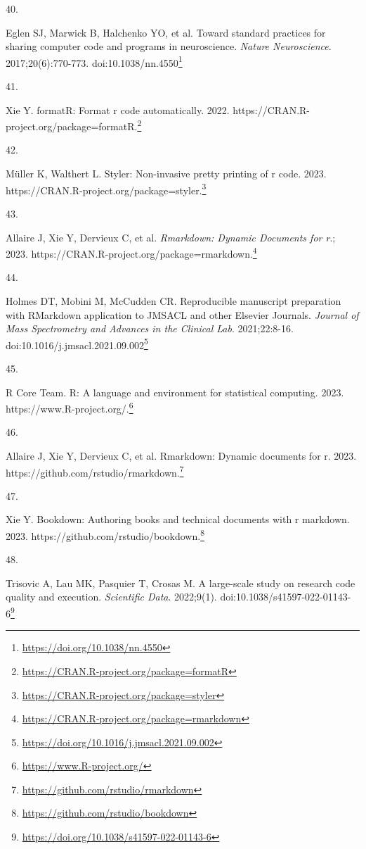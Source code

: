 \documentclass[
  a4paper,
]{book}
\newlength{\cslhangindent}
\newlength{\csllabelwidth}
\newlength{\cslentryspacingunit} %
\newenvironment{CSLReferences}[2] %
 {%
  \setlength{\parindent}{0pt}
  \ifodd #1
  \let\oldpar\par
  \def\par{\hangindent=\cslhangindent\oldpar}
  \fi
  \setlength{\parskip}{#2\cslentryspacingunit}
 }%
 {}
\newcommand{\CSLLeftMargin}[1]{\parbox[t]{\csllabelwidth}{#1}}
\newcommand{\CSLRightInline}[1]{\parbox[t]{\linewidth - \csllabelwidth}{#1}\break}
\renewcommand{\href}[2]{#2\footnote{\url{#1}}}
\begin{document}
\begin{CSLReferences}{0}{0}
\leavevmode{}%
\CSLLeftMargin{40. }%
\CSLRightInline{Eglen SJ, Marwick B, Halchenko YO, et al. Toward standard practices for sharing computer code and programs in neuroscience. \emph{Nature Neuroscience}. 2017;20(6):770-773. doi:\href{https://doi.org/10.1038/nn.4550}{10.1038/nn.4550}}

\leavevmode{}%
\CSLLeftMargin{41. }%
\CSLRightInline{Xie Y. formatR: Format r code automatically. 2022. \href{https://CRAN.R-project.org/package=formatR}{https://CRAN.R-project.org/package=formatR.}}

\leavevmode{}%
\CSLLeftMargin{42. }%
\CSLRightInline{Müller K, Walthert L. Styler: Non-invasive pretty printing of r code. 2023. \href{https://CRAN.R-project.org/package=styler}{https://CRAN.R-project.org/package=styler.}}

\leavevmode{}%
\CSLLeftMargin{43. }%
\CSLRightInline{Allaire J, Xie Y, Dervieux C, et al. \emph{Rmarkdown: Dynamic Documents for r}.; 2023. \href{https://CRAN.R-project.org/package=rmarkdown}{https://CRAN.R-project.org/package=rmarkdown.}}

\leavevmode{}%
\CSLLeftMargin{44. }%
\CSLRightInline{Holmes DT, Mobini M, McCudden CR. Reproducible manuscript preparation with RMarkdown application to JMSACL and other Elsevier Journals. \emph{Journal of Mass Spectrometry and Advances in the Clinical Lab}. 2021;22:8-16. doi:\href{https://doi.org/10.1016/j.jmsacl.2021.09.002}{10.1016/j.jmsacl.2021.09.002}}

\leavevmode{}%
\CSLLeftMargin{45. }%
\CSLRightInline{R Core Team. R: A language and environment for statistical computing. 2023. \href{https://www.R-project.org/}{https://www.R-project.org/.}}

\leavevmode{}%
\CSLLeftMargin{46. }%
\CSLRightInline{Allaire J, Xie Y, Dervieux C, et al. Rmarkdown: Dynamic documents for r. 2023. \href{https://github.com/rstudio/rmarkdown}{https://github.com/rstudio/rmarkdown.}}

\leavevmode{}%
\CSLLeftMargin{47. }%
\CSLRightInline{Xie Y. Bookdown: Authoring books and technical documents with r markdown. 2023. \href{https://github.com/rstudio/bookdown}{https://github.com/rstudio/bookdown.}}

\leavevmode{}%
\CSLLeftMargin{48. }%
\CSLRightInline{Trisovic A, Lau MK, Pasquier T, Crosas M. A large-scale study on research code quality and execution. \emph{Scientific Data}. 2022;9(1). doi:\href{https://doi.org/10.1038/s41597-022-01143-6}{10.1038/s41597-022-01143-6}}


\end{CSLReferences}
\end{document}
